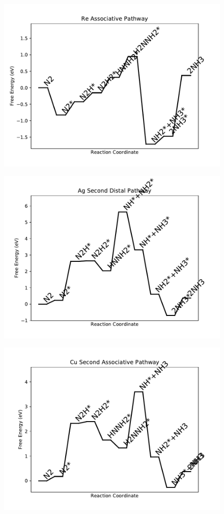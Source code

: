 \begin{figure}
\centering
\includegraphics[width=0.8\linewidth]{data/plots/Re_associative.pdf}
\end{figure}

\begin{figure}
\centering
\includegraphics[width=0.8\linewidth]{data/plots/Ag_distal_2.pdf}
\end{figure}

\begin{figure}
\centering
\includegraphics[width=0.8\linewidth]{data/plots/Cu_associative_2.pdf}
\end{figure}

